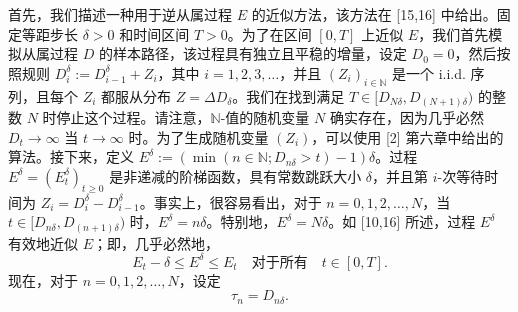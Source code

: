 

首先，我们描述一种用于逆从属过程 \( E \) 的近似方法，该方法在 [15,16] 中给出。固定等距步长 \(\delta > 0\) 和时间区间 \( T > 0 \)。为了在区间 \([0, T]\) 上近似 \( E \)，我们首先模拟从属过程 \( D \) 的样本路径，该过程具有独立且平稳的增量，设定 \( D_0 = 0 \)，然后按照规则 \( D_i^\delta := D_{i-1}^\delta + Z_i \)，其中 \( i = 1, 2, 3, \ldots \)，并且 \( (Z_i)_{i \in \mathbb{N}} \) 是一个 i.i.d. 序列，且每个 \( Z_i \) 都服从分布 \( Z = \Delta D_\delta \)。我们在找到满足 \( T \in [D_{N\delta}, D_{(N+1)\delta}) \) 的整数 \( N \) 时停止这个过程。请注意，\( \mathbb{N} \)-值的随机变量 \( N \) 确实存在，因为几乎必然 \( D_t \to \infty \) 当 \( t \to \infty \) 时。为了生成随机变量 \( (Z_i) \)，可以使用 [2] 第六章中给出的算法。接下来，定义 \( E^\delta := (\min(n \in \mathbb{N}; D_{n\delta} > t) - 1) \delta \)。过程 \( E^\delta = (E_t^\delta)_{t \geq 0} \) 是非递减的阶梯函数，具有常数跳跃大小 \(\delta\)，并且第 \( i \)-次等待时间为 \( Z_i = D_i^\delta - D_{i-1}^\delta \)。事实上，很容易看出，对于 \( n = 0, 1, 2, \ldots, N \)，当 \( t \in [D_{n\delta}, D_{(n+1)\delta}) \) 时，\( E^\delta = n\delta \)。特别地，\( E^\delta = N\delta \)。如 [10,16] 所述，过程 \( E^\delta \) 有效地近似 \( E \)；即，几乎必然地，
\[
E_t - \delta \leq E^\delta \leq E_t \quad \text{对于所有} \quad t \in [0, T].
\]
现在，对于 \( n = 0, 1, 2, \ldots, N \)，设定
\[
\tau_n = D_{n\delta}.
\]

